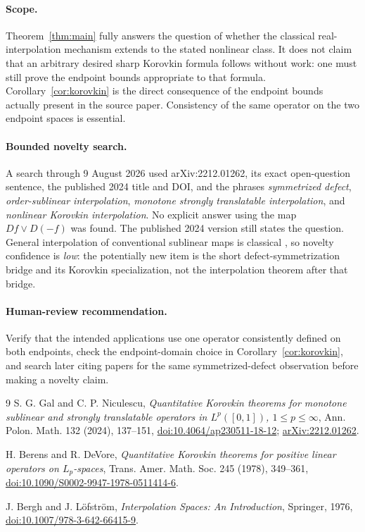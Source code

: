 \documentclass[11pt]{article}
\newcommand{\Dop}{D}
\begin{document}
\paragraph{Scope.}
Theorem~\ref{thm:main} fully answers the question of whether the classical
real-interpolation mechanism extends to the stated nonlinear class. It does
not claim that an arbitrary desired sharp Korovkin formula follows without
work: one must still prove the endpoint bounds appropriate to that formula.
Corollary~\ref{cor:korovkin} is the direct consequence of the endpoint bounds
actually present in the source paper. Consistency of the same operator on
the two endpoint spaces is essential.

\paragraph{Bounded novelty search.}
A search through 9 August 2026 used arXiv:2212.01262, its exact open-question
sentence, the published 2024 title and DOI, and the phrases
\emph{symmetrized defect}, \emph{order-sublinear interpolation},
\emph{monotone strongly translatable interpolation}, and
\emph{nonlinear Korovkin interpolation}. No explicit answer using the map
$\Dop f\vee\Dop(-f)$ was found. The published 2024 version \cite{GN} still
states the question. General interpolation of conventional sublinear maps
is classical \cite{BL}, so novelty confidence is \emph{low}: the potentially
new item is the short defect-symmetrization bridge and its Korovkin
specialization, not the interpolation theorem after that bridge.

\paragraph{Human-review recommendation.}
Verify that the intended applications use one operator consistently defined
on both endpoints, check the endpoint-domain choice in
Corollary~\ref{cor:korovkin}, and search later citing papers for the same
symmetrized-defect observation before making a novelty claim.

\begin{thebibliography}{9}
S. G. Gal and C. P. Niculescu,
\emph{Quantitative Korovkin theorems for monotone sublinear and strongly
translatable operators in $L^p([0,1])$, $1\leq p\leq\infty$},
Ann. Polon. Math. 132 (2024), 137--151,
\href{https://doi.org/10.4064/ap230511-18-12}{doi:10.4064/ap230511-18-12};
\href{https://arxiv.org/abs/2212.01262}{arXiv:2212.01262}.

H. Berens and R. DeVore,
\emph{Quantitative Korovkin theorems for positive linear operators on
$L_p$-spaces},
Trans. Amer. Math. Soc. 245 (1978), 349--361,
\href{https://doi.org/10.1090/S0002-9947-1978-0511414-6}
{doi:10.1090/S0002-9947-1978-0511414-6}.

J. Bergh and J. L\"ofstr\"om,
\emph{Interpolation Spaces: An Introduction},
Springer, 1976,
\href{https://doi.org/10.1007/978-3-642-66415-9}
{doi:10.1007/978-3-642-66415-9}.
\end{thebibliography}
\end{document}
